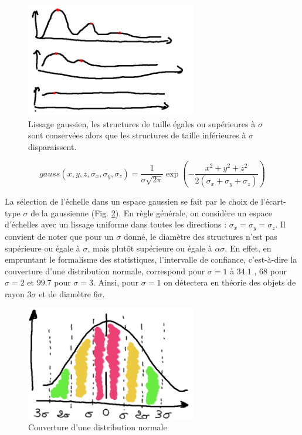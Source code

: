   \begin{figure}[!ht]
    \centering
    \includegraphics[height=5cm]{Images/gaussian_smoothing.png}
    \caption{Lissage gaussien, les structures de taille égales ou supérieures à $\sigma$ sont conservées alors que les structures de taille inférieures à $\sigma$ disparaissent.}
    \label{fig:gaussian_smoothing}
  \end{figure}
  
  \begin{equation}
    gauss(x,y,z,\sigma_{x},\sigma_{y},\sigma_{z}) = \frac{1}{ \sigma\sqrt{2\pi} }\exp(-\frac{x^2 + y^2 + z^2}{2(\sigma_{x}+ \sigma_{y}+ \sigma_{z}) })
    \label{eq:Gaussienne 3D}
  \end{equation}
  
  La sélection de l'échelle dans un espace gaussien se fait par le choix de l'écart-type $\sigma$ de la gaussienne (Fig. \ref{fig:normal_distribution_probability_coverage}). En règle générale, on considère un espace d'échelles avec un lissage uniforme dans toutes les directions : $\sigma_x = \sigma_y = \sigma_z$. Il convient de noter que pour un $\sigma$ donné, le diamètre des structures n'est pas supérieure ou égale à $\sigma$, mais plutôt supérieure ou égale à $\alpha\sigma$. En effet, en empruntant le formalisme des statistiques, l'intervalle de confiance, c'est-à-dire la couverture d'une distribution normale, correspond pour $\sigma=1$ à $34.1$ \percent, $68$ \percent{}pour $\sigma=2$ et $99.7$ \percent{}pour $\sigma=3$. Ainsi, pour $\sigma=1$ on détectera en théorie des objets de rayon $3\sigma$ et de diamètre $6\sigma$.  
  
  \begin{figure}[!ht]
    \centering
    \includegraphics[height=5cm]{Images/normal_distribution_probability_coverage.png}
    \caption{Couverture d'une distribution normale}
    \label{fig:normal_distribution_probability_coverage}
  \end{figure}
  
